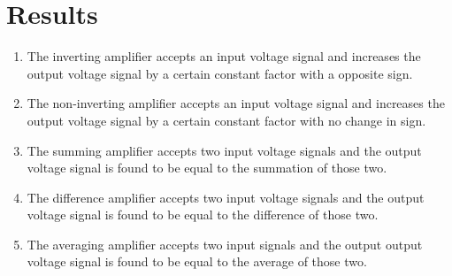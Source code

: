 \section{Results}
\begin{enumerate}
    \item The inverting amplifier accepts an input voltage signal and increases the output voltage signal by a certain constant factor with a opposite sign.
    \item The non-inverting amplifier accepts an input voltage signal and increases the output voltage signal by a certain constant factor with no change in sign.
    \item The summing amplifier accepts two input voltage signals and the output voltage signal is found to be equal to the summation of those two.
    \item The difference amplifier accepts two input voltage signals and the output voltage signal is found to be equal to the difference of those two.
    \item The averaging amplifier accepts two input signals and the output output voltage signal is found to be equal to the average of those two.
\end{enumerate}
